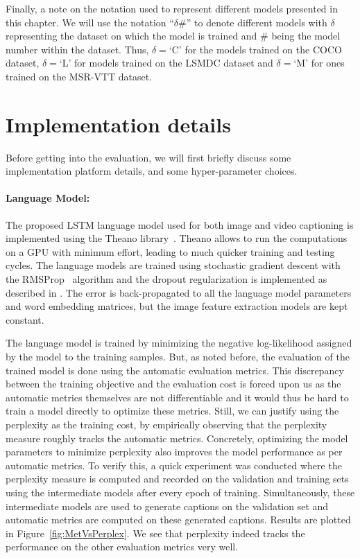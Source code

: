 Finally, a note on the notation used to represent different models presented
in this chapter.
We will use the notation ``$\delta\#$'' to denote different models with $\delta$
representing the dataset on which the model is trained and $\#$ being the model
number within the dataset.
Thus, $\delta=$`C' for the models trained on the COCO dataset, $\delta=$`L' for
models trained on the LSMDC dataset and $\delta=$`M' for ones trained on the
MSR-VTT dataset.

\section{Implementation details}
Before getting into the evaluation, we will first briefly discuss some
implementation platform details, and some hyper-parameter choices.
\paragraph*{Language Model:} The proposed LSTM language model used
for both image and video captioning is implemented using the Theano
library~\cite{Bastien-Theano-2012}.
Theano allows to run the computations on a GPU with minimum effort, leading to
much quicker training and testing cycles.
The language models are trained using stochastic gradient descent with the
RMSProp~\cite{rmspropTielman} algorithm and the dropout regularization is
implemented as described in \cite{ZarembaSV14}.
The error is back-propagated to all the language model parameters and word
embedding matrices, but the image feature extraction models are kept constant.
%

The language model is trained by minimizing the negative log-likelihood assigned
by the model to the training samples.
But, as noted before, the evaluation of the trained model is done using the automatic
evaluation metrics.
This discrepancy between the training objective and the evaluation cost is
forced upon us as the automatic metrics themselves are not differentiable and it
would thus be hard to train a model directly to optimize these metrics.
Still, we can justify using the perplexity as the training cost, by empirically
observing that the perplexity measure roughly tracks the automatic metrics.
Concretely, optimizing the model parameters to minimize perplexity also improves the
model performance as per automatic metrics.
To verify this, a quick experiment was conducted where the perplexity measure is
computed and recorded on the validation and training sets using the intermediate
models after every epoch of training.
Simultaneously, these intermediate models are used to generate captions on the
validation set and automatic metrics are computed on these generated captions.
Results are plotted in Figure~\ref{fig:MetVsPerplex}.
We see that perplexity indeed tracks the performance on the other evaluation
metrics very well.

